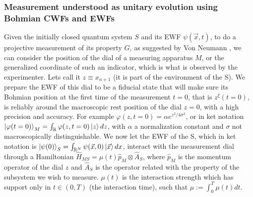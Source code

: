\documentclass[11pt, a4paper]{article} %
\newcommand{\R}{\mathbb{R}} %
\begin{document}

\subsubsection*{Measurement understood as unitary evolution using Bohmian CWFs and EWFs}

Given the initially closed quantum system $S$ and its EWF $\psi(\vec{x},t)$, to do a projective measurement of its property $G$, as suggested by Von Neumann \cite{VonNeumann}, we can consider the position of the dial of a measuring apparatus $M$, or the generalized coordinate of such an indicator, which is what is observed by the experimenter. Lets call it $z\equiv x_{n+1}$ (it is part of the environment of the S). We prepare the EWF of this dial to be a fiducial state that will make sure its Bohmian position at the first time of the measurement $t=0$, that is $z^\xi(t=0)$, is reliably around the macroscopic rest position of the dial $z=0$, with a high precision and accuracy. For example $\varphi(z,t=0)=\alpha e^{z^2/4\sigma^2}$, or in ket notation $\ket{\varphi(t=0)}_M=\int_\R\varphi(z,t=0) \ket{z}dz$,  with $\alpha$ a normalization constant and $\sigma$ not macroscopically distinguishable. We now let the EWF of the S, which in ket notation is $\ket{\psi(0)}_S=\int_{\R^N}\psi(\vec{x},0)\ket{\vec{x}}dx$, interact with the measurement dial through a Hamiltonian $\hat{H}_{MS}=\mu(t)\hat{p}_M\otimes \hat{A}_S$, where $\hat{p}_M$ is the momentum operator of the dial $z$ and $\hat{A}_S$ is the operator related with the property of the subsystem we wish to measure. $\mu(t)$ is the interaction strength which has support only in $t\in(0,T)$ (the interaction time), such that $\mu:=\int_0^T\mu(t)dt$. 
\end{document}

